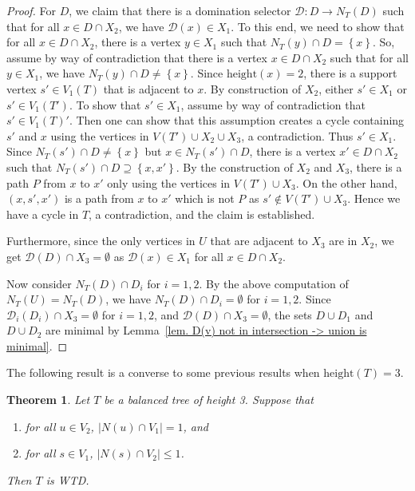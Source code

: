 \documentclass[12pt, reqno]{amsart}
\theoremstyle{definition}
\theoremstyle{plain}
\newtheorem{theorem}{Theorem}[section]
\theoremstyle{definition}
\newcommand{\hh}{\mbox{height}}
\newcommand\set[1]{\left\lbrace #1 \right\rbrace}
\newcommand{\calD}{\mathcal{D}}
\begin{document}
\begin{proof}
    For $D$, we claim that there is a domination selector $\calD: D \to N_T(D)$ such that for all $x \in D \cap X_2$, we have $\calD(x) \in X_1$.
    To this end, we need to show that for all $x \in D \cap X_2$, there is a vertex $y \in X_1$ such that $N_T(y) \cap D = \set{x}$.
    So, assume by way of contradiction that there is a vertex $x \in D \cap X_2$ such that for all $y\in X_1$, we have $N_T(y) \cap D \neq \set{x}$.
    Since $\hh(x) = 2$, there is a support vertex $s' \in V_1(T)$ that is adjacent to $x$.
    By construction of $X_2$, either $s' \in X_1$ or $s' \in V_1(T')$.
    To show that $s' \in X_1$, assume by way of contradiction that $s' \in V_1(T)'$.
    Then one can show that this assumption creates a cycle containing $s'$ and $x$ using the vertices in $V(T') \cup X_2 \cup X_3$, a contradiction.
    Thus $s' \in X_1$.
    Since $N_T(s') \cap D \neq \set{x}$ but $x \in N_T(s') \cap D$, there is a vertex $x' \in D \cap X_2$ such that $N_T(s') \cap D \supseteq \set{x,x'}$.
    By the construction of $X_2$ and $X_3$, there is a path $P$ from $x$ to $x'$ only using the vertices in $V(T') \cup X_3$.
    On the other hand, $(x,s',x')$ is a path from $x$ to $x'$ which is not $P$ as $s' \not \in V(T') \cup X_3$.
    Hence we have a cycle in $T$, a contradiction, and the claim is established.

    Furthermore, since the only vertices in $U$ that are adjacent to $X_3$ are in $X_2$, we get $\calD(D) \cap X_3 = \emptyset$ as $\calD(x) \in X_1$ for all $x \in D \cap X_2$.

    Now consider $N_T(D) \cap D_i$ for $i = 1,2$.
    By the above computation of $N_T(U) = N_T(D)$, we have $N_T(D) \cap D_i =\emptyset$ for $i = 1,2$.
    Since $\calD_i(D_i) \cap X_3 = \emptyset$ for $i = 1,2$, and $\calD(D) \cap X_3 = \emptyset$, the sets $D \cup D_1$ and $D \cup D_2$ are minimal by Lemma~\ref{lem. D(v) not in intersection -> union is minimal}. 
\end{proof}  

The following result is a converse to some previous results when $\hh(T) = 3$.

\begin{theorem}
\label{thm. h(T) = 3 and no P4 and |N(s) cup V2| = 2 -> unmimxed}
Let $T$ be a balanced tree of height 3.
Suppose that  
\begin{enumerate}
    \item for all $u \in V_2$, $|N(u) \cap V_1| = 1$, and
    \item for all $s \in V_1$,  $|N(s) \cap V_2| \leq 1$.
\end{enumerate}
Then $T$ is WTD.
\end{theorem}
\end{document}
